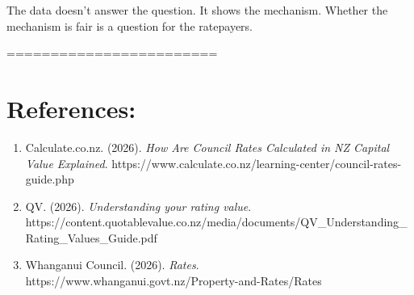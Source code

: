\documentclass[
  7pt,
  a4paper,
  DIV=11,
  numbers=noendperiod]{scrartcl}
\begin{document}
The data doesn't answer the question. It shows the mechanism. Whether
the mechanism is fair is a question for the ratepayers.

========================

\section{References:}\label{references}

\begin{enumerate}
\def\labelenumi{\arabic{enumi}.}
\item
  Calculate.co.nz. (2026). \emph{How Are Council Rates Calculated in NZ
  \textbar{} Capital Value Explained}.
  https://www.calculate.co.nz/learning-center/council-rates-guide.php
\item
  QV. (2026). \emph{Understanding your rating value}.
  https://content.quotablevalue.co.nz/media/documents/QV\_Understanding\_Rating\_Values\_Guide.pdf
\item
  Whanganui Council. (2026). \emph{Rates}.
  https://www.whanganui.govt.nz/Property-and-Rates/Rates
\end{enumerate}
\end{document}
